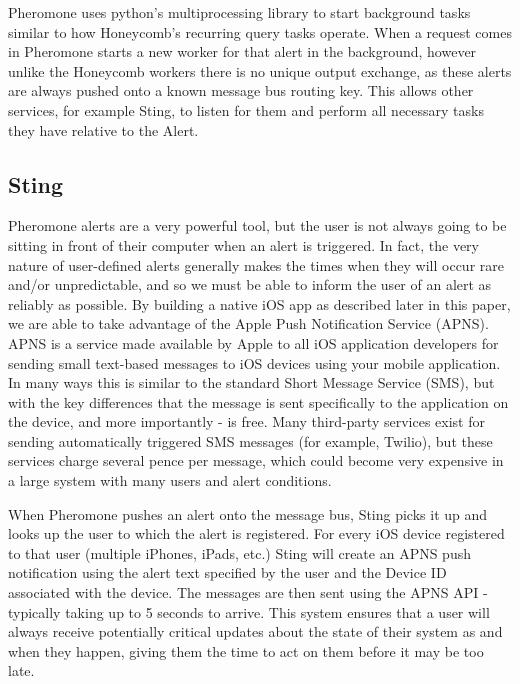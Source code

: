 Pheromone uses python's multiprocessing library to start background tasks
similar to how Honeycomb’s recurring query tasks operate. When a request comes
in Pheromone starts a new worker for that alert in the background, however
unlike the Honeycomb workers there is no unique output exchange, as these alerts
are always pushed onto a known message bus routing key. This allows other
services, for example Sting, to listen for them and perform all necessary tasks
they have relative to the Alert.

\subsection{Sting}

Pheromone alerts are a very powerful tool, but the user is not always going to
be sitting in front of their computer when an alert is triggered. In fact, the
very nature of user-defined alerts generally makes the times when they will
occur rare and/or unpredictable, and so we must be able to inform the user of an
alert as reliably as possible. By building a native iOS\cite{ios} app as described
later in this paper, we are able to take advantage of the Apple Push
Notification Service (APNS)\cite{apns}. APNS is a service made available by Apple to
all iOS application developers for sending small text-based messages to iOS
devices using your mobile application. In many ways this is similar to the
standard Short Message Service (SMS), but with the key differences that the
message is sent specifically to the application on the device, and more
importantly - is free. Many third-party services exist for sending automatically
triggered SMS messages (for example, Twilio\cite{twilio}), but these services charge
several pence per message, which could become very expensive in a large system
with many users and alert conditions.

When Pheromone pushes an alert onto the message bus, Sting picks it up and
looks up the user to which the alert is registered. For every iOS device
registered to that user (multiple iPhones, iPads, etc.) Sting will create an
APNS push notification using the alert text specified by the user and the
Device ID associated with the device. The messages are then sent using the
APNS API - typically taking up to 5 seconds to arrive. This system ensures
that a user will always receive potentially critical updates about the state
of their system as and when they happen, giving them the time to act on them
before it may be too late.
